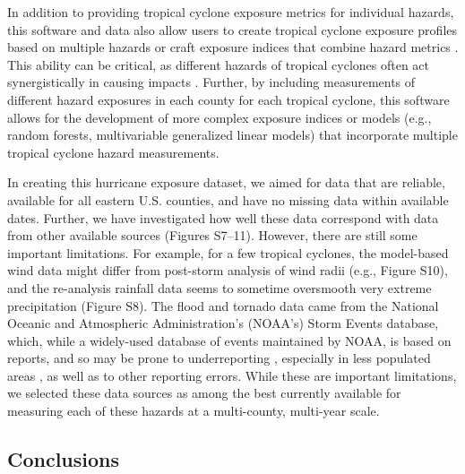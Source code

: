 In addition to providing tropical cyclone exposure metrics for individual
hazards, this software and data also allow users to create tropical cyclone
exposure profiles based on multiple hazards or craft exposure indices that
combine hazard metrics \citep{chakraborty2005population, peduzzi2009assessing}.
This ability can be critical, as different hazards of tropical cyclones
often act synergistically in causing impacts \citep{smith2009}. Further, by
including measurements of different hazard exposures in each county for each
tropical cyclone, this software allows for the development of more complex
exposure indices or models (e.g., random forests, multivariable generalized
linear models) that incorporate multiple tropical cyclone hazard measurements.  

In creating this hurricane exposure dataset, we aimed for data that are
reliable, available for all eastern U.S. counties, and have no missing data
within available dates. Further, we have investigated how well these data
correspond with data from other available sources (Figures S7--11). However,
there are still some important limitations. For example, for a few tropical cyclones, 
the model-based wind data might differ from post-storm analysis of wind radii
(e.g., Figure S10), and the re-analysis rainfall data seems to sometime oversmooth
very extreme precipitation (Figure S8). 
The flood and tornado data
came from the National Oceanic and Atmospheric Administration's (NOAA's) Storm
Events database, which, while a widely-used database of events maintained by
NOAA, is based on reports, and so may be prone to underreporting
\citep{Ashley2008flood, Curran2000}, especially in less populated areas
\citep{Witt1998, Ashley2007}, as well as to other reporting errors. While these
are important limitations, we selected these data sources as among the best
currently available for measuring each of these hazards at a multi-county,
multi-year scale.

\subsection*{Conclusions}

